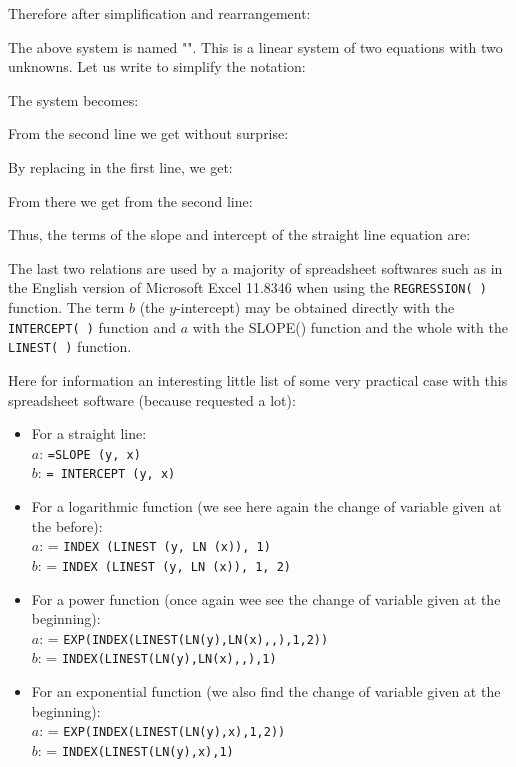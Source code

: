 	Therefore after simplification and rearrangement:
	
	The above system is named "". This is a linear system of two equations with two unknowns. Let us write to simplify the notation:
	
	The system becomes:
	
	From the second line we get without surprise:
	
	By replacing in the first line, we get:
	
	From there we get from the second line:
	
	Thus, the terms of the slope and intercept of the straight line equation are:
	
	The last two relations are used by a majority of spreadsheet softwares such as in the English version of Microsoft Excel 11.8346 when using the \texttt{REGRESSION( )} function. The term $b$ (the $y$-intercept) may be obtained directly with the \texttt{INTERCEPT( )} function and $a$ with the SLOPE() function and the whole with the \texttt{LINEST( )} function.
	
	Here for information an interesting little list of some very practical case with this spreadsheet software (because requested a lot):
	\begin{itemize}
		\item For a straight line:\\
		$a$: \texttt{=SLOPE (y, x)}\\
		$b$: \texttt{= INTERCEPT (y, x)}
		\item For a logarithmic function (we see here again the change of variable given at the before):\\
		$a$: = \texttt{INDEX (LINEST (y, LN (x)), 1)}\\
		$b$: = \texttt{INDEX (LINEST (y, LN (x)), 1, 2)}\\
		\item For a power function (once again wee see the change of variable given at the beginning):\\
		$a$: = \texttt{EXP(INDEX(LINEST(LN(y),LN(x),,),1,2))}\\
		$b$: = \texttt{INDEX(LINEST(LN(y),LN(x),,),1)}\\
		\item For an exponential function (we also find the change of variable given at the beginning):\\
		$a$: = \texttt{EXP(INDEX(LINEST(LN(y),x),1,2))}\\
		$b$: = \texttt{INDEX(LINEST(LN(y),x),1)}\\
	\end{itemize}
	
